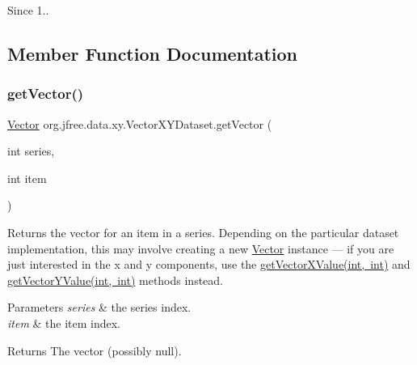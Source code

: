 \begin{DoxySince}{Since}
1.. 
\end{DoxySince}


\subsection{Member Function Documentation}
\mbox{\label{interfaceorg_1_1jfree_1_1data_1_1xy_1_1_vector_x_y_dataset_aba926f9aaf6a756befe095ac4b84de0e}} 
\subsubsection{\texorpdfstring{get\+Vector()}{getVector()}}
{\footnotesize\ttfamily \mbox{\hyperlink{classorg_1_1jfree_1_1data_1_1xy_1_1_vector}{Vector}} org.\+jfree.\+data.\+xy.\+Vector\+X\+Y\+Dataset.\+get\+Vector (\begin{DoxyParamCaption}\item[{int}]{series,  }\item[{int}]{item }\end{DoxyParamCaption})}

Returns the vector for an item in a series. Depending on the particular dataset implementation, this may involve creating a new \mbox{\hyperlink{classorg_1_1jfree_1_1data_1_1xy_1_1_vector}{Vector}} instance --- if you are just interested in the x and y components, use the \mbox{\hyperlink{interfaceorg_1_1jfree_1_1data_1_1xy_1_1_vector_x_y_dataset_a1126d5960a9f446d360f89715d93d209}{get\+Vector\+X\+Value(int, int)}} and \mbox{\hyperlink{interfaceorg_1_1jfree_1_1data_1_1xy_1_1_vector_x_y_dataset_ac3a14bcfbf867f625abfe605a20d1d54}{get\+Vector\+Y\+Value(int, int)}} methods instead.


\begin{DoxyParams}{Parameters}
{\em series} & the series index. \\
\hline
{\em item} & the item index.\\
\hline
\end{DoxyParams}
\begin{DoxyReturn}{Returns}
The vector (possibly {\ttfamily null}). 
\end{DoxyReturn}


